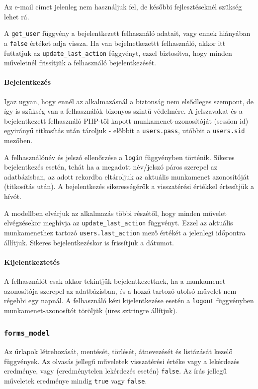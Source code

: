 \documentclass[12pt,a4paper,twoside]{article}
\begin{document}
Az e-mail címet jelenleg nem használjuk fel, de későbbi fejlesztéseknél szükség
lehet rá.

A \texttt{get\_user} függvény a bejelentkezett felhasználó adatait, vagy ennek
hiányában a \texttt{false} értéket adja vissza. Ha van bejelnetkezettt
felhasználó, akkor itt futtatjuk az \texttt{update\_last\_action} függvényt,
ezzel biztosítva, hogy minden műveletnél frissítjük a felhasználó
bejelentkezését.

\paragraph{Bejelentkezés}
Igaz ugyan, hogy ennél az alkalmazásnál a biztonság nem elsődleges szempont, de
így is szükség van a felhasználók bizonyos szintű védelmére. A jelszavakat és
a bejelentkezett felhasználó PHP-től kapott munkamenet-azonosítóját (session
id\cite{PHP-SID}) egyirányű titkosítás után tároljuk - előbbit a
\texttt{users.pass}, utóbbit a \texttt{users.sid} mezőben.

A felhasználónév és jelszó ellenőrzése a \texttt{login} függvényben
történik. Sikeres bejelentkezés esetén, tehát ha a megadott név/jelszó páros
szerepel az adatbázisban, az adott rekordba eltároljuk az aktuális munkamenet
azonosítóját (titkosítás után). A bejelentkezés sikerességérők a visszatérési
értékkel értesítjük a hívót.

A modellben elvárjuk az alkalmazás többi részétől, hogy minden művelet
elvégzésekor meghívja az \texttt{update\_last\_action} függvényt. Ezzel az
aktuális munkamenethez tartozó \texttt{users.last\_action} mező értékét a
jelenlegi időpontra állítjuk. Sikeres bejelentkezéskor is frissítjuk a dátumot.

\paragraph{Kijelentkeztetés}
A felhasználót csak akkor tekintjük bejelentkezettnek, ha a
munkamenet azonosítója szerepel az adatbázisban, és a hozzá tartozó utolsó
művelet nem régebbi egy napnál. A felhasználó kézi kijelentkezése esetén a
\texttt{logout} függvényben munkamenet-azonosítót töröljük (üres sztringre állítjuk).


\subsubsection{\texttt{forms\_model}}

Az űrlapok létrehozását, mentését, törlését, átnevezését és listázását kezelő
függvények. Az olvasás jellegű műveletek visszatérési értéke vagy a lekérdezés
eredménye, vagy (eredménytelen lekérdezés esetén) \texttt{false}. Az írás
jellegű műveletek eredménye mindig \texttt{true} vagy \texttt{false}.
\end{document}
